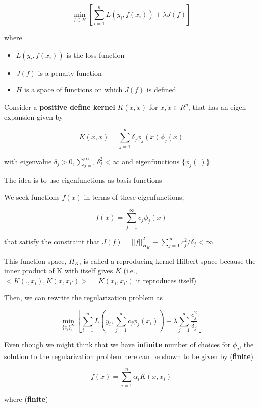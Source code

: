 \documentclass[
]{book}
\begin{document}
\begin{equation}
\label{eq:reg1}
\underset{f \in H}{\operatorname{min}} [ \sum_{i = 1}^n L(y_i, f(x_i)) + \lambda J(f)]
\end{equation}

where

\begin{itemize}
\item
  \(L(y_i, f(x_i))\) is the loss function
\item
  \(J(f)\) is a penalty function
\item
  \(H\) is a space of functions on which \(J(f)\) is defined
\end{itemize}

Consider a \textbf{positive define kernel} \(K(x, \tilde{x})\) for \(x, \tilde{x} \in R^p\), that has an eigen-expansion given by

\[
K(x, \tilde{x}) = \sum_{j=1}^\infty \delta_j \phi_j(x) \phi_j (\tilde{x})
\]

with eigenvalue \(\delta_j >0, \sum_{j = 1}^\infty \delta^2_j < \infty\) and eigenfunctions \(\{ \phi_j (.)\}\)

The idea is to use eigenfunctions as basis functions

We seek functions \(f(x)\) in terms of these eigenfunctions,

\[
f(x) = \sum_{j=1}^\infty c_j \phi_j (x)
\]

that satisfy the constraint that \(J(f) = ||f||^2_{H_K} \equiv \sum_{j=1}^\infty c_j^2/\delta_j < \infty\)

This function space, \(H_K\), is called a reproducing kernel Hilbert space because the inner product of K with itself gives \(K\) (i.e., \(<K(.,x_i), K(x,x_{i'})> = K(x_i, x_{i'})\) it reproduces itself)

Then, we can rewrite the regularization problem as

\begin{equation}
\label{eq:reg2}
\underset{\{c_j\}^\infty_1}{\operatorname{min}} [\sum_{i=1}^nL(y_i, \sum_{j = 1}^\infty c_j \phi_j (x_i)) + \lambda \sum_{j = 1}^\infty \frac{c_j^2}{\delta_j} ]
\end{equation}

Even though we might think that we have \textbf{infinite} number of choices for \(\phi_j\), the solution to the regularization problem here can be shown to be given by (\textbf{finite})

\[
f(x) = \sum_{i=1}^n \alpha_i K(x, x_i)
\]

where (\textbf{finite})
\end{document}
